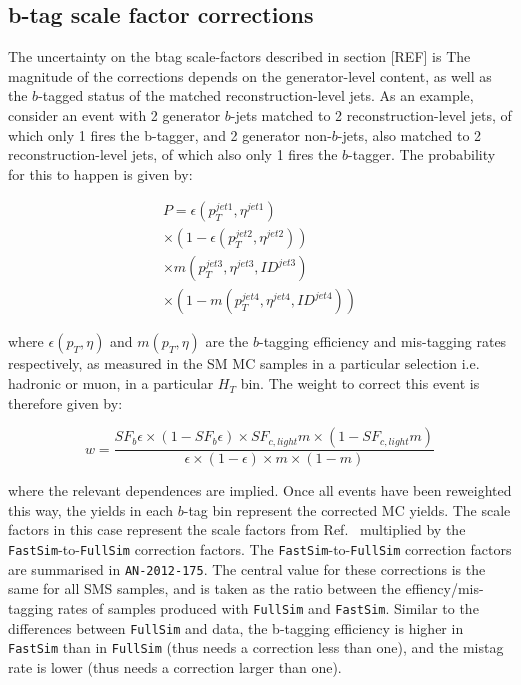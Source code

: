 \subsection{b-tag scale factor corrections\label{sec:sms-syst-btag}}

The uncertainty on the btag scale-factors described in section [REF]
is 
The magnitude of the corrections depends on the generator-level
content, as well as the $b$-tagged status of the matched
reconstruction-level jets. As an example, consider an event with 2
generator $b$-jets matched to 2 reconstruction-level jets, of which
only 1 fires the b-tagger, and 2 generator non-$b$-jets, also matched
to 2 reconstruction-level jets, of which also only 1 fires the
$b$-tagger. The probability for this to happen is given by:

\begin{equation}
  \begin{split}
    P = \epsilon(p_{T}^{jet1}, \eta^{jet1}) \\ 
    \times (1 - \epsilon(p_{T}^{jet2}, \eta^{jet2})) \\ 
    \times m(p_{T}^{jet3}, \eta^{jet3}, ID^{jet3}) \\ 
    \times (1-m(p_{T}^{jet4}, \eta^{jet4}, ID^{jet4}))
  \end{split}
\end{equation}

where $\epsilon(p_{T}, \eta)$ and $m(p_{T}, \eta)$ are the $b$-tagging
efficiency and mis-tagging rates respectively, as measured in the SM
MC samples in a particular selection i.e. hadronic or muon, in a
particular $H_{T}$ bin. The weight to correct this event is therefore
given by:

\begin{equation}
  \label{equ:blah1}
  w=\frac{SF_{b}\epsilon\times(1-SF_{b}\epsilon)\times SF_{c,light}m
    \times (1-SF_{c,light}m)}{\epsilon\times(1-\epsilon)\times m \times
    (1-m)} 
\end{equation}

where the relevant dependences are implied. Once all events have been
reweighted this way, the yields in each $b$-tag bin represent the
corrected MC yields. The scale factors in this case represent the
scale factors from Ref.~\cite{btagpogtwiki} multiplied by the
\verb!FastSim!-to-\verb!FullSim! correction factors. The
\verb!FastSim!-to-\verb!FullSim! correction factors are summarised in
\texttt{AN-2012-175}. The central value for these corrections is the
same for all SMS samples, and is taken as the ratio between the
effiency/mis-tagging rates of \ttbar samples produced with
\verb!FullSim! and \verb!FastSim!. Similar to the differences between
\verb!FullSim! and data, the b-tagging efficiency is higher in
\verb!FastSim! than in \verb!FullSim! (thus needs a correction less
than one), and the mistag rate is lower (thus needs a correction
larger than one).



